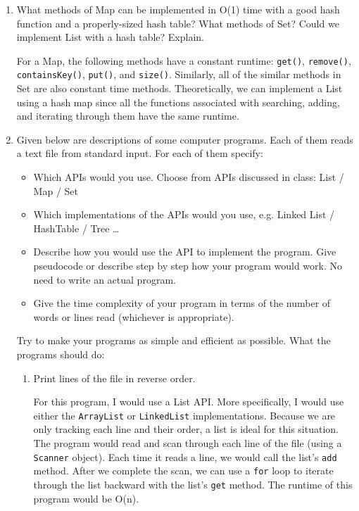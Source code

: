 \documentclass[letterpaper, 11pt]{article}
\begin{document}
\begin{enumerate}
\begin{enumerate}
    \end{enumerate}
    \item What methods of Map can be implemented in O(1) time with a good hash function and a properly-sized hash table? What methods of Set? Could we implement List with a hash table? Explain.

    For a Map, the following methods have a constant runtime: \texttt{get()}, \texttt{remove()}, \texttt{containsKey()}, \texttt{put()}, and \texttt{size()}. Similarly, all of the similar methods in Set are also constant time methods. Theoretically, we can implement a List using a hash map since all the functions associated with searching, adding, and iterating through them have the same runtime.
    
    \item Given below are descriptions of some computer programs. Each of them reads a text file from standard input. For each of them specify:
    \begin{itemize}
        \item Which APIs would you use. Choose from APIs discussed in class: List / Map / Set
        \item Which implementations of the APIs would you use, e.g. Linked List / HashTable / Tree \ldots
        \item Describe how you would use the API to implement the program. Give pseudocode or describe step by step how your program would work. No need to write an actual program.
        \item Give the time complexity of your program in terms of the number of words or lines read (whichever is appropriate).
    \end{itemize}
    Try to make your programs as simple and efficient as possible. What the programs should do:
    \begin{enumerate}
        \item Print lines of the file in reverse order.

        For this program, I would use a List API. More specifically, I would use either the \texttt{ArrayList} or \texttt{LinkedList} implementations. Because we are only tracking each line and their order, a list is ideal for this situation. The program would read and scan through each line of the file (using a \texttt{Scanner} object). Each time it reads a line, we would call the list's \texttt{add} method. After we complete the scan, we can use a \texttt{for} loop to iterate through the list backward with the list's \texttt{get} method. The runtime of this program would be O(n).
        

\end{enumerate}
\end{enumerate}
\end{document}
